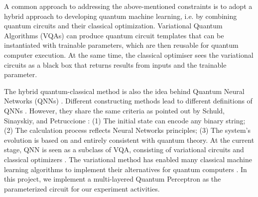 A common approach to addressing the above-mentioned constraints is to adopt a hybrid approach to developing quantum machine learning, i.e. by combining quantum circuits and their classical optimization.
Variational Quantum Algorithms (VQAs) \cite{cerezo2021variational} can produce quantum circuit templates that can be instantiated with trainable parameters, which are then reusable for quantum computer execution.
At the same time, the classical optimiser sees the variational circuits as a black box that returns results from inputs and the trainable parameter.

The hybrid quantum-classical method is also the idea behind Quantum Neural Networks (QNNs) \cite{altaisky2001quantum}.
Different constructing methods lead to different definitions of QNNs \cite{paetznick2013, zhaoBuildingQuantumNeural2019, caoQuantumNeuronElementary2017}.
However, they share the same criteria as pointed out by Schuld, Sinayskiy, and Petruccione \cite{schuldQuestQuantumNeural2014}:
(1) The initial state can encode any binary string;
(2) The calculation process reflects Neural Networks principles;
(3) The system's evolution is based on and entirely consistent with quantum theory.
At the current stage, QNN is seen as a subclass of VQA, consisting of variational circuits and classical optimizers \cite{abbasPowerQuantumNeural2021}.
The variational method has enabled many classical machine learning algorithms to implement their alternatives for quantum computers \cite{hugginsQuantumMachineLearning2019, takakiLearningTemporalData2021, shinguBoltzmannMachineLearning2021, dallaire-demersQuantumGenerativeAdversarial2018}.
In this project, we implement a multi-layered Quantum Perceptron \cite{kristensenArtificialSpikingQuantum2021} as the parameterized circuit for our experiment activities.


